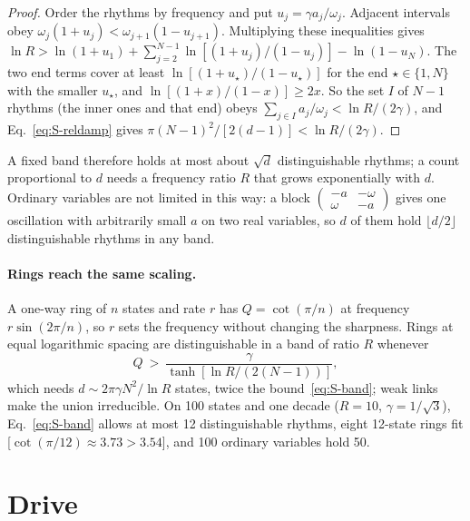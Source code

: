 \begin{proof}
Order the rhythms by frequency and put $u_j=\gamma a_j/\omega_j$. Adjacent intervals obey $\omega_j(1+u_j)<\omega_{j+1}(1-u_{j+1})$. Multiplying these inequalities gives $\ln R>\ln(1+u_1)+\sum_{j=2}^{N-1}\ln[(1+u_j)/(1-u_j)]-\ln(1-u_N)$. The two end terms cover at least $\ln[(1+u_\star)/(1-u_\star)]$ for the end $\star\in\{1,N\}$ with the smaller $u_\star$, and $\ln[(1+x)/(1-x)]\ge2x$. So the set $I$ of $N-1$ rhythms (the inner ones and that end) obeys $\sum_{j\in I}a_j/\omega_j<\ln R/(2\gamma)$, and Eq.~\eqref{eq:S-reldamp} gives $\pi(N-1)^2/[2(d-1)]<\ln R/(2\gamma)$.
\end{proof}

\noindent A fixed band therefore holds at most about $\sqrt d$ distinguishable rhythms; a count proportional to $d$ needs a frequency ratio $R$ that grows exponentially with $d$. Ordinary variables are not limited in this way: a block $\left(\begin{smallmatrix}-a&-\omega\\ \omega&-a\end{smallmatrix}\right)$ gives one oscillation with arbitrarily small $a$ on two real variables, so $d$ of them hold $\lfloor d/2\rfloor$ distinguishable rhythms in any band.

\paragraph*{Rings reach the same scaling.} A one-way ring of $n$ states and rate $r$ has $Q=\cot(\pi/n)$ at frequency $r\sin(2\pi/n)$, so $r$ sets the frequency without changing the sharpness. Rings at equal logarithmic spacing are distinguishable in a band of ratio $R$ whenever
\begin{equation}
Q\ >\ \frac{\gamma}{\tanh[\ln R/(2(N-1))]},
\label{eq:S-ringband}
\end{equation}
which needs $d\sim2\pi\gamma N^2/\ln R$ states, twice the bound~\eqref{eq:S-band}; weak links make the union irreducible. On 100 states and one decade ($R=10$, $\gamma=1/\sqrt3$), Eq.~\eqref{eq:S-band} allows at most 12 distinguishable rhythms, eight 12-state rings fit [$\cot(\pi/12)\approx3.73>3.54$], and 100 ordinary variables hold 50.

\section{Drive}\label{sec:driving}

